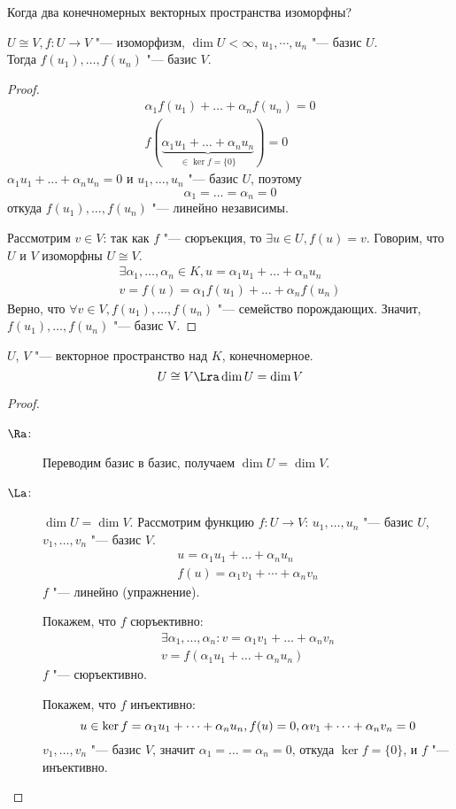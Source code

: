 Когда два конечномерных векторных пространства изоморфны?
\begin{lemma}
	$U \cong V, f \colon U \to V$ "--- изоморфизм, $\dim U < \infty$, $u_1, \cdots, u_n$ "--- базис $U$.\\
	Тогда $f(u_1), \dots, f(u_n)$ "--- базис $V$.
\end{lemma}
\begin{proof}
	\begin{gather*}
		\alpha_1 f(u_1) + \dots + \alpha_nf(u_n) = 0 \\
		f(\underbrace{\alpha_1 u_1 + \dots + \alpha_nu_n}_{\in\ker f = \{0\}}) = 0
	\end{gather*}
	$\alpha_1u_1 + \dots + \alpha_nu_n = 0$ и $u_1, \dots, u_n$ "--- базис $U$, поэтому
	\[ \alpha_1 = \dots = \alpha_n = 0 \]
	откуда $f(u_1), \dots, f(u_n)$ "--- линейно независимы.

	Рассмотрим $v \in V$: так как $f$ "--- сюръекция, то $\exists u \in U, f(u) = v$.
	Говорим, что $U$ и $V$ изоморфны $U \cong V$.
	\begin{gather*}
		\exists \alpha_1, \dots, \alpha_n \in  K, u = \alpha_1 u_1 + \dots + \alpha_nu_n \\
		v = f(u) = \alpha_1f(u_1) + \dots + \alpha_nf(u_n)
	\end{gather*}
	Верно, что $\forall v \in V, f(u_1), \dots, f(u_n)$ "--- семейство порождающих.
	Значит, $f(u_1), \dots, f(u_n)$ "--- базис V.
\end{proof}

\begin{conseq}
	$U$, $V$ "--- векторное пространство над $K$, конечномерное.
	\[ U \cong V \Lra \dim U = \dim V \]
\end{conseq}
\begin{proof}
	\begin{description}
	\item[$\Ra$:]
		Переводим базис в базис, получаем $\dim U = \dim V$.

	\item[$\La$:]
		$\dim U = \dim V$.
		Рассмотрим функцию $f: U \to V$:
		$u_1, \dots, u_n$ "--- базис $U$, $v_1, \dots, v_n$ "--- базис $V$.
		\begin{gather*}
			u = \alpha_1u_1 + \dots + \alpha_nu_n \\
			f(u) = \alpha_1 v_1 + \cdots + \alpha_n v_n
		\end{gather*}
		$f$ "--- линейно (упражнение).

		Покажем, что $f$ сюръективно:
		\begin{gather*}
			\exists \alpha_1, \dots, \alpha_n\colon v = \alpha_1 v_1 + \dots + \alpha_n v_n \\
			v = f(\alpha_1 u_1 + \dots + \alpha_n u_n) 
		\end{gather*}
		$f$ "--- сюръективно.

		Покажем, что $f$ инъективно:
		\[
			u \in \ker f = \alpha_1 u_1 + \cdots + \alpha_nu_n, f(u) = 0,
				\alpha v_1 + \cdots + \alpha_nv_n = 0 \\
		\]
		$v_1, \dots, v_n$ "--- базис $V$, значит $\alpha_1 = \dots = \alpha_n = 0$, откуда
		$\ker f = \{0\}$, и $f$ "--- инъективно.
	\end{description}
\end{proof}

